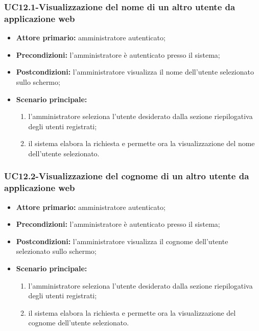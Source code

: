 \subsubsection{UC12.1-Visualizzazione del nome di un altro utente da applicazione web}
\begin{itemize}
	\item \textbf{Attore primario:} amministratore autenticato;

	\item \textbf{Precondizioni:} l'amministratore è autenticato presso il sistema;

	\item \textbf{Postcondizioni:} l'amministratore visualizza il nome dell'utente selezionato sullo schermo;

	\item \textbf{Scenario principale:}
	\begin{enumerate}
   		 \item  l'amministratore seleziona l'utente desiderato dalla sezione riepilogativa degli utenti registrati;
    	 \item  il sistema elabora la richiesta e permette ora la visualizzazione del nome dell'utente selezionato.
	\end{enumerate}
\end{itemize}

\subsubsection{UC12.2-Visualizzazione del cognome di un altro utente da applicazione web}
\begin{itemize}
	\item \textbf{Attore primario:} amministratore autenticato;

	\item \textbf{Precondizioni:} l'amministratore è autenticato presso il sistema;

	\item \textbf{Postcondizioni:} l'amministratore visualizza il cognome dell'utente selezionato sullo schermo;

	\item \textbf{Scenario principale:}
		\begin{enumerate}
   			 \item  l'amministratore seleziona l'utente desiderato dalla sezione riepilogativa degli utenti registrati;
    		 \item  il sistema elabora la richiesta e permette ora la visualizzazione del cognome dell'utente selezionato.
		\end{enumerate}
\end{itemize}

